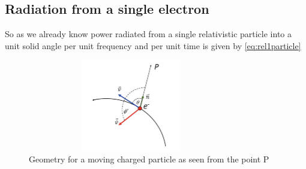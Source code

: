 \documentclass[12pt]{report}
\begin{document}
\subsection{Radiation from a single electron}
So as we already know power radiated from a single relativistic particle into a unit solid angle per unit frequency and per unit time is given by \eqref{eq:rel1particle}
\begin{figure}[h!]
\includegraphics[height=4cm,width=9cm]{singleprad.png}
\caption{Geometry for a moving charged particle as seen from the point P}
\end{figure}
\end{document}

